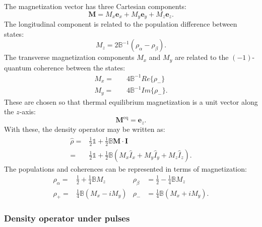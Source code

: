 The magnetization vector has three Cartesian components:
\begin{equation}
  \mathbf{M} = M_x\mathbf{e}_x + M_y\mathbf{e}_y + M_z\mathbf{e}_z.
\end{equation}
 The longitudinal component is related to the population difference between states:
 \begin{equation}
   M_z = 2\mathbb{B}^{-1}(\rho_\alpha - \rho_\beta).
 \end{equation}
The transverse magnetization components $M_x$ and $M_y$ are related to the $(-1)$-quantum coherence between the states:
\begin{align}
  M_x =&\quad4\mathbb{B}^{-1}Re\{\rho_-\}\\
  M_y =&\quad4\mathbb{B}^{-1}Im\{\rho_-\}.
\end{align}
These are chosen so that thermal equilibrium magnetization is a unit vector
along the $z$-axis:
\begin{equation}
  \mathbf{M}^{\text{eq}} = \mathbf{e}_z.
\end{equation}
With these, the density operator may be written as:
\begin{align}
  \hat{\rho} =& \frac{1}{2}\mathbb{1} + \frac{1}{2}\mathbb{B}\mathbf{M}\cdot\hat{\mathbf{I}}\\
  =& \frac{1}{2}\mathbb{1} + \frac{1}{2}\mathbb{B}(M_x\hat{I}_x + M_y\hat{I}_y + M_z\hat{I}_z).
\end{align}
The populations and coherences can be represented in terms of magnetization:
\begin{align}
  \rho_\alpha =& \frac{1}{2} + \frac{1}{4}\mathbb{B}M_z & \rho_\beta &= \frac{1}{2} - \frac{1}{4}\mathbb{B}M_z\\
  \rho_+ =&  \frac{1}{4}\mathbb{B}(M_x - iM_y) & \rho_- &= \frac{1}{4}\mathbb{B}(M_x + iM_y).
\end{align}

\subsubsection{Density operator under pulses}

